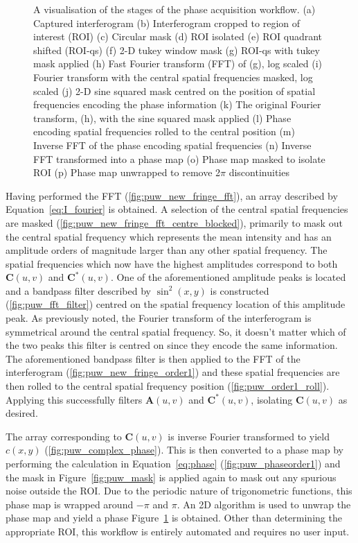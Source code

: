 \begin{figure}
\begin{subfigure}{0.23\textwidth}
		\caption{}
		\label{fig:puw_unwrapped_phase}
	\end{subfigure}
	\caption{A visualisation of the stages of the phase acquisition workflow. (a) Captured interferogram (b) Interferogram cropped to region of interest (ROI) (c) Circular mask (d) ROI isolated (e) ROI quadrant shifted (ROI-qs) (f) 2-D tukey window mask (g) ROI-qs with tukey mask applied (h) Fast Fourier transform (FFT) of (g), log scaled (i) Fourier transform with the central spatial frequencies masked, log scaled (j) 2-D sine squared mask centred on the position of spatial frequencies encoding the phase information (k) The original Fourier transform, (h), with the sine squared mask applied (l) Phase encoding spatial frequencies rolled to the central position (m) Inverse FFT of the phase encoding spatial frequencies (n) Inverse FFT transformed into a phase map (o) Phase map masked to isolate ROI (p) Phase map unwrapped to remove 2$\pi$ discontinuities}
	\label{fig:phase_unwrap_workflow}
\end{figure}

Having performed the FFT (\ref{fig:puw_new_fringe_fft}), an array described by Equation~\ref{eq:I_fourier} is obtained. A selection of the central spatial frequencies are masked (\ref{fig:puw_new_fringe_fft_centre_blocked}), primarily to mask out the central spatial frequency which represents the mean intensity and has an amplitude orders of magnitude larger than any other spatial frequency. The spatial frequencies which now have the highest amplitudes correspond to both $\boldsymbol{C}(u,v)$ and $\boldsymbol{C}^{*}(u,v)$. One of the aforementioned amplitude peaks is located and a bandpass filter described by $\sin^{2}(x,y)$ is constructed (\ref{fig:puw_fft_filter}) centred on the spatial frequency location of this amplitude peak. As previously noted, the Fourier transform of the interferogram is symmetrical around the central spatial frequency. So, it doesn't matter which of the two peaks this filter is centred on since they encode the same information. The aforementioned bandpass filter is then applied to the FFT of the interferogram (\ref{fig:puw_new_fringe_order1}) and these spatial frequencies are then rolled to the central spatial frequency position (\ref{fig:puw_order1_roll}). Applying this successfully filters $\boldsymbol{A}(u,v)$ and $\boldsymbol{C}^{*}(u,v)$, isolating $\boldsymbol{C}(u,v)$ as desired.

The array corresponding to $\boldsymbol{C}(u,v)$ is inverse Fourier transformed to yield $c(x,y)$ (\ref{fig:puw_complex_phase}). This is then converted to a phase map by performing the calculation in Equation~\ref{eq:phase} (\ref{fig:puw_phaseorder1}) and the mask in Figure~\ref{fig:puw_mask} is applied again to mask out any spurious noise outside the ROI. Due to the periodic nature of trigonometric functions, this phase map is wrapped around $-\pi$ and $\pi$. An 2D  algorithm is used to unwrap the phase map and yield a phase Figure~\ref{fig:puw_unwrapped_phase} is obtained.\cite{herraez2002fast} Other than determining the appropriate ROI, this workflow is entirely automated and requires no user input. 

